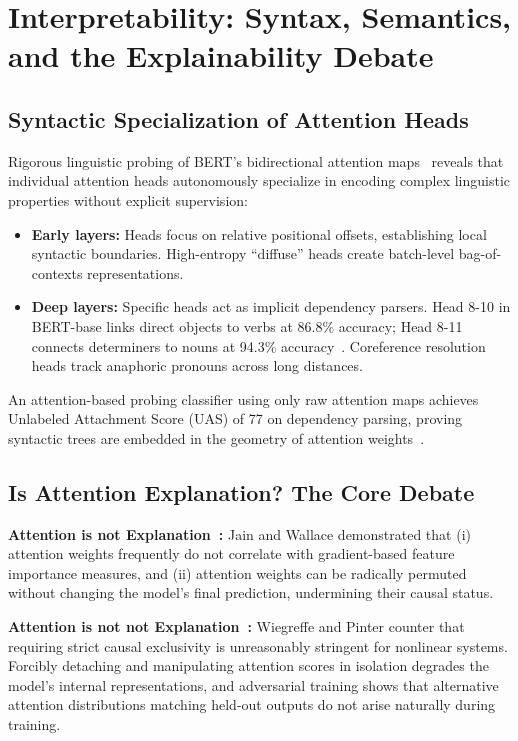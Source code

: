 \documentclass[11pt]{article}
\begin{document}
\section{Interpretability: Syntax, Semantics, and the Explainability Debate}

\subsection{Syntactic Specialization of Attention Heads}

Rigorous linguistic probing of BERT's bidirectional attention maps~\cite{clark2019does} reveals that individual attention heads autonomously specialize in encoding complex linguistic properties without explicit supervision:
\begin{itemize}
  \item \textbf{Early layers:} Heads focus on relative positional offsets, establishing local syntactic boundaries. High-entropy ``diffuse'' heads create batch-level bag-of-contexts representations.
  \item \textbf{Deep layers:} Specific heads act as implicit dependency parsers. Head 8-10 in BERT-base links direct objects to verbs at 86.8\% accuracy; Head 8-11 connects determiners to nouns at 94.3\% accuracy~\cite{clark2019does}. Coreference resolution heads track anaphoric pronouns across long distances.
\end{itemize}

An attention-based probing classifier using only raw attention maps achieves Unlabeled Attachment Score (UAS) of 77 on dependency parsing, proving syntactic trees are embedded in the geometry of attention weights~\cite{jawahar2019does}.

\subsection{Is Attention Explanation? The Core Debate}

\textbf{Attention is not Explanation~\cite{jain2019attention}:} Jain and Wallace demonstrated that (i) attention weights frequently do not correlate with gradient-based feature importance measures, and (ii) attention weights can be radically permuted without changing the model's final prediction, undermining their causal status.

\textbf{Attention is not not Explanation~\cite{wiegreffe2019attention}:} Wiegreffe and Pinter counter that requiring strict causal exclusivity is unreasonably stringent for nonlinear systems. Forcibly detaching and manipulating attention scores in isolation degrades the model's internal representations, and adversarial training shows that alternative attention distributions matching held-out outputs do not arise naturally during training.
\end{document}
